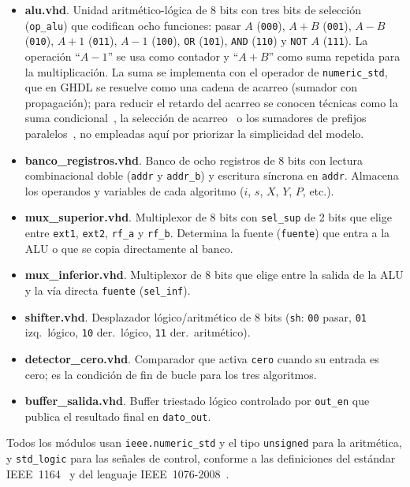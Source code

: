 \documentclass[llncs]{llncs}
\begin{document}
\begin{itemize}
  \item \textbf{alu.vhd}. Unidad aritmético-lógica de 8 bits con tres bits de
  selección (\texttt{op\_alu}) que codifican ocho funciones: pasar $A$
  (\texttt{000}), $A+B$ (\texttt{001}), $A-B$ (\texttt{010}), $A+1$
  (\texttt{011}), $A-1$ (\texttt{100}), \texttt{OR} (\texttt{101}),
  \texttt{AND} (\texttt{110}) y \texttt{NOT} $A$ (\texttt{111}). La
  operación ``$A-1$'' se usa como contador y ``$A+B$'' como suma repetida
  para la multiplicación. La suma se implementa con el operador de
  \texttt{numeric\_std}, que en GHDL se resuelve como una cadena de acarreo
  (sumador con propagación); para reducir el retardo del acarreo se conocen
  técnicas como la suma condicional~\cite{sklansky1960}, la selección de
  acarreo~\cite{bedrij1962} o los sumadores de prefijos
  paralelos~\cite{kogge1973}, no empleadas aquí por priorizar la simplicidad
  del modelo.
  \item \textbf{banco\_registros.vhd}. Banco de ocho registros de 8 bits con
  lectura combinacional doble (\texttt{addr} y \texttt{addr\_b}) y escritura
  síncrona en \texttt{addr}. Almacena los operandos y variables de cada
  algoritmo ($i$, $s$, $X$, $Y$, $P$, etc.).
  \item \textbf{mux\_superior.vhd}. Multiplexor de 8 bits con \texttt{sel\_sup}
  de 2 bits que elige entre \texttt{ext1}, \texttt{ext2}, \texttt{rf\_a} y
  \texttt{rf\_b}. Determina la fuente (\texttt{fuente}) que entra a la ALU o
  que se copia directamente al banco.
  \item \textbf{mux\_inferior.vhd}. Multiplexor de 8 bits que elige entre la
  salida de la ALU y la vía directa \texttt{fuente} (\texttt{sel\_inf}).
  \item \textbf{shifter.vhd}. Desplazador lógico/aritmético de 8 bits
  (\texttt{sh}: \texttt{00} pasar, \texttt{01} izq.\ lógico, \texttt{10} der.\
  lógico, \texttt{11} der.\ aritmético).
  \item \textbf{detector\_cero.vhd}. Comparador que activa \texttt{cero}
  cuando su entrada es cero; es la condición de fin de bucle para los tres
  algoritmos.
  \item \textbf{buffer\_salida.vhd}. Buffer triestado lógico controlado por
  \texttt{out\_en} que publica el resultado final en \texttt{dato\_out}.
\end{itemize}

Todos los módulos usan \texttt{ieee.numeric\_std} y el tipo
\texttt{unsigned} para la aritmética, y \texttt{std\_logic} para las señales
de control, conforme a las definiciones del estándar
IEEE~1164~\cite{ieee1164} y del lenguaje IEEE~1076-2008~\cite{ieee1076}.
\end{document}
